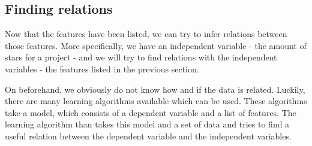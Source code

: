    
    
    \subsection{Finding relations}
        Now that the features have been listed, we can try to infer relations between those features. More specifically, we have an independent variable - the amount of stars for a project - and we will try to find relations with the independent variables - the features listed in the previous section.
        
        
        On beforehand, we obviously do not know how and if the data is related. Luckily, there are many learning algorithms available which can be used. 
        These algorithms take a model, which consists of a dependent variable and a list of features.
        The learning algorithm than takes this model and a set of data and tries to find a useful relation between the dependent variable and the independent variables.
        
